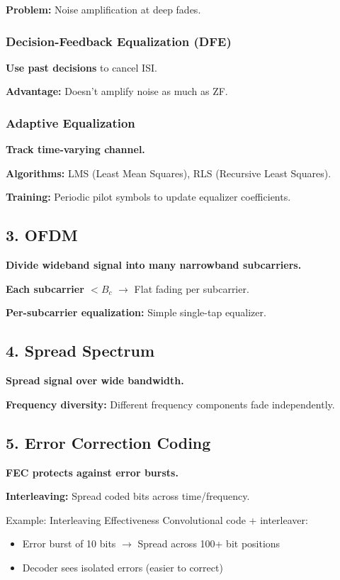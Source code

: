 \textbf{Problem:} Noise amplification at deep fades.

\subsubsection{Decision-Feedback Equalization (DFE)}

\textbf{Use past decisions} to cancel ISI.

\textbf{Advantage:} Doesn't amplify noise as much as ZF.

\subsubsection{Adaptive Equalization}

\textbf{Track time-varying channel.}

\textbf{Algorithms:} LMS (Least Mean Squares), RLS (Recursive Least Squares).

\textbf{Training:} Periodic pilot symbols to update equalizer coefficients.

\subsection{3. OFDM}

\textbf{Divide wideband signal into many narrowband subcarriers.}

\textbf{Each subcarrier $< B_c$} $\rightarrow$ Flat fading per subcarrier.

\textbf{Per-subcarrier equalization:} Simple single-tap equalizer.

\subsection{4. Spread Spectrum}

\textbf{Spread signal over wide bandwidth.}

\textbf{Frequency diversity:} Different frequency components fade independently.

\subsection{5. Error Correction Coding}

\textbf{FEC protects against error bursts.}

\textbf{Interleaving:} Spread coded bits across time/frequency.

\begin{calloutbox}{Example: Interleaving Effectiveness}
Convolutional code + interleaver:
\begin{itemize}
\item Error burst of 10 bits $\rightarrow$ Spread across 100+ bit positions
\item Decoder sees isolated errors (easier to correct)
\end{itemize}
\end{calloutbox}

